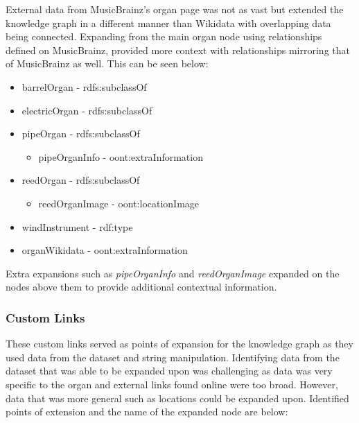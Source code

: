 External data from MusicBrainz's organ page \cite{organmusicbrainz} was not as vast but extended the knowledge graph in a different manner than Wikidata with overlapping data being connected. Expanding from the main organ node using relationships defined on MusicBrainz, provided more context with relationships mirroring that of MusicBrainz as well. This can be seen below:

\vspace{-0.15cm}
\begin{itemize}
    \itemsep0em 
    \item barrelOrgan - rdfs:subclassOf
           \vspace{-0.025cm}
    \item electricOrgan - rdfs:subclassOf
           \vspace{-0.025cm}
    \item pipeOrgan - rdfs:subclassOf
    \begin{itemize}
        \itemsep0em 
        \vspace{-0.2cm}
        \item pipeOrganInfo - oont:extraInformation
        \vspace{-0.2cm}
    \end{itemize}
    \item reedOrgan - rdfs:subclassOf
    \begin{itemize}
        \itemsep0em 
        \vspace{-0.2cm}
        \item reedOrganImage - oont:locationImage
        \vspace{-0.2cm}
    \end{itemize}
    \item windInstrument - rdf:type
           \vspace{-0.025cm}
    \item organWikidata - oont:extraInformation
\end{itemize}

Extra expansions such as \textit{pipeOrganInfo} and \textit{reedOrganImage} expanded on the nodes above them to provide additional contextual information. 

\subsubsection{Custom Links}
\hspace*{0.5cm} These custom links served as points of expansion for the knowledge graph as they used data from the dataset and string manipulation. Identifying data from the dataset that was able to be expanded upon was challenging as data was very specific to the organ and external links found online were too broad. However, data that was more general such as locations could be expanded upon. Identified points of extension and the name of the expanded node are below:


